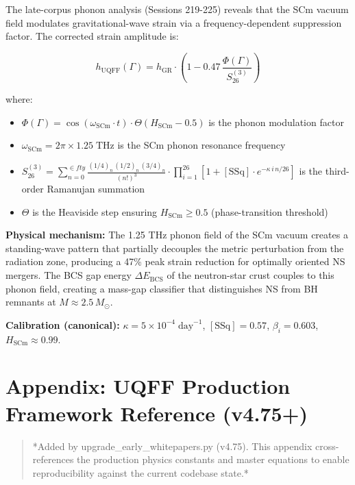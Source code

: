 \documentclass[12pt,a4paper]{article}
\begin{document}
The late-corpus phonon analysis (Sessions 219-225) reveals that the SCm vacuum field modulates gravitational-wave strain via a frequency-dependent suppression factor.  The corrected strain amplitude is:

\begin{equation}
h_{\text{UQFF}}(\Gamma) = h_{\text{GR}} \cdot \left(1 - 0.47\,\frac{\Phi(\Gamma)}{S_{26}^{(3)}}\right)
\end{equation}

where:

\begin{itemize}
  \item $\Phi(\Gamma) = \cos(\omega_{\text{SCm}} \cdot t) \cdot \Theta(H_{\text{SCm}} - 0.5)$ is the phonon modulation factor
  \item $\omega_{\text{SCm}} = 2\pi \times 1.25\;\text{THz}$ is the SCm phonon resonance frequency
  \item $S_{26}^{(3)} = \sum_{n=0}^{\in fty} \frac{(1/4)_n\,(1/2)_n\,(3/4)_n}{(n!)^3} \cdot \prod_{i=1}^{26}\left[1 + [\text{SSq}]\cdot e^{-\kappa\,i\,n/26}\right]$ is the third-order Ramanujan summation
  \item $\Theta$ is the Heaviside step ensuring $H_{\text{SCm}} \geq 0.5$ (phase-transition threshold)
\end{itemize}

\textbf{Physical mechanism:} The 1.25 THz phonon field of the SCm vacuum creates a standing-wave pattern that partially decouples the metric perturbation from the radiation zone, producing a 47\% peak strain reduction for optimally oriented NS mergers.  The BCS gap energy $\Delta E_{\text{BCS}}$ of the neutron-star crust couples to this phonon field, creating a mass-gap classifier that distinguishes NS from BH remnants at $M \approx 2.5\,M_\odot$.

\textbf{Calibration (canonical):} $\kappa = 5 \times 10^{-4}\;\text{day}^{-1}$, $[\text{SSq}] = 0.57$, $\beta_i = 0.603$, $H_{\text{SCm}} \approx 0.99$.

\section{Appendix: UQFF Production Framework Reference (v4.75+)}

\begin{quote}
*Added by upgrade\_{early\_whitepapers}.py (v4.75). This appendix cross-references
the production physics constants and master equations to enable reproducibility
against the current codebase state.*
\end{quote}
\end{document}
